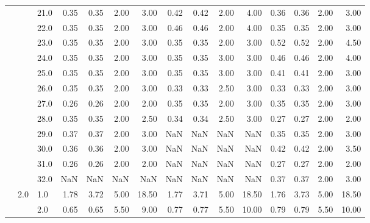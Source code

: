 \begin{tabular}{lllrrrrrrrrrrrr}
       &     & 21.0 &       0.35 &      0.35 & 2.00 &   3.00 &       0.42 &      0.42 & 2.00 &   4.00 &       0.36 &      0.36 & 2.00 &   3.00 \\
       &     & 22.0 &       0.35 &      0.35 & 2.00 &   3.00 &       0.46 &      0.46 & 2.00 &   4.00 &       0.35 &      0.35 & 2.00 &   3.00 \\
       &     & 23.0 &       0.35 &      0.35 & 2.00 &   3.00 &       0.35 &      0.35 & 2.00 &   3.00 &       0.52 &      0.52 & 2.00 &   4.50 \\
       &     & 24.0 &       0.35 &      0.35 & 2.00 &   3.00 &       0.35 &      0.35 & 3.00 &   3.00 &       0.46 &      0.46 & 2.00 &   4.00 \\
       &     & 25.0 &       0.35 &      0.35 & 2.00 &   3.00 &       0.35 &      0.35 & 3.00 &   3.00 &       0.41 &      0.41 & 2.00 &   3.00 \\
       &     & 26.0 &       0.35 &      0.35 & 2.00 &   3.00 &       0.33 &      0.33 & 2.50 &   3.00 &       0.33 &      0.33 & 2.00 &   3.00 \\
       &     & 27.0 &       0.26 &      0.26 & 2.00 &   2.00 &       0.35 &      0.35 & 2.00 &   3.00 &       0.35 &      0.35 & 2.00 &   3.00 \\
       &     & 28.0 &       0.35 &      0.35 & 2.00 &   2.50 &       0.34 &      0.34 & 2.50 &   3.00 &       0.27 &      0.27 & 2.00 &   2.00 \\
       &     & 29.0 &       0.37 &      0.37 & 2.00 &   3.00 &        NaN &       NaN &  NaN &    NaN &       0.35 &      0.35 & 2.00 &   3.00 \\
       &     & 30.0 &       0.36 &      0.36 & 2.00 &   3.00 &        NaN &       NaN &  NaN &    NaN &       0.42 &      0.42 & 2.00 &   3.50 \\
       &     & 31.0 &       0.26 &      0.26 & 2.00 &   2.00 &        NaN &       NaN &  NaN &    NaN &       0.27 &      0.27 & 2.00 &   2.00 \\
       &     & 32.0 &        NaN &       NaN &  NaN &    NaN &        NaN &       NaN &  NaN &    NaN &       0.37 &      0.37 & 2.00 &   3.00 \\
       & 2.0 & 1.0  &       1.78 &      3.72 & 5.00 &  18.50 &       1.77 &      3.71 & 5.00 &  18.50 &       1.76 &      3.73 & 5.00 &  18.50 \\
       &     & 2.0  &       0.65 &      0.65 & 5.50 &   9.00 &       0.77 &      0.77 & 5.50 &  10.00 &       0.79 &      0.79 & 5.50 &  10.00 \\

\end{tabular}

